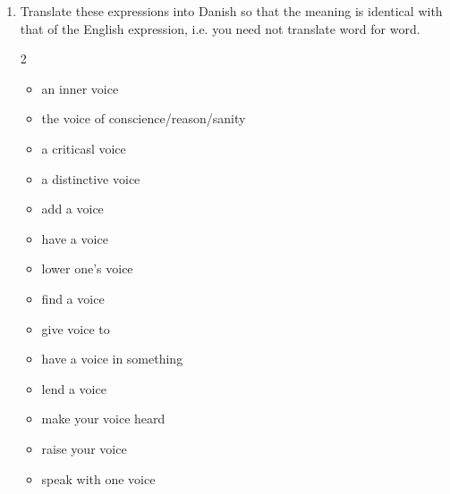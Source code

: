 \documentclass[10pt,a4paper,table]{article}
\begin{document}
\begin{enumerate}[label=\arabic*., leftmargin=*]
  \item Translate these expressions into Danish so that the meaning is identical with that of the English expression, i.e. you need not translate word for word.
  \begin{multicols}{2}
  \begin{itemize}[leftmargin=1.5em]
    \item an inner voice
    \item the voice of conscience/reason/sanity
    \item a criticasl voice
    \item a distinctive voice
    \item add a voice
    \item have a voice
    \item lower one's voice
    \item find a voice
    \item give voice to
    \item have a voice in something
    \item lend a voice
    \item make your voice heard
    \item raise your voice
    \item speak with one voice
  \end{itemize}
  \end{multicols}

\end{enumerate}
\end{document}
